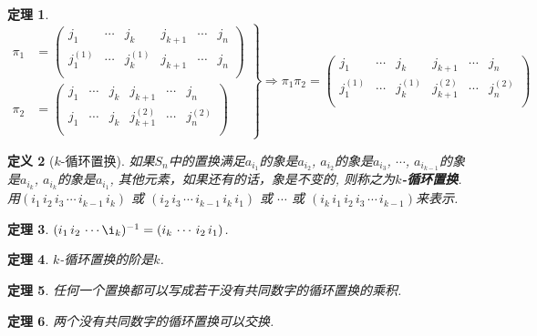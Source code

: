 \documentclass[UTF8]{ctexart}
\newtheorem{Definition}{定义}%
\newtheorem{Theorem}[Definition]{定理}
\begin{document}
\begin{Theorem}
$$
\left.
\begin{aligned}
\pi_1 &= \begin{pmatrix} 
j_1       & \cdots & j_k       & j_{k+1} & \cdots & j_n \\
j_1^{(1)} & \cdots & j_k^{(1)} & j_{k+1} & \cdots & j_n \\
\end{pmatrix} \\
\pi_2 &= \begin{pmatrix} 
j_1       & \cdots & j_k       & j_{k+1}       & \cdots & j_n      \\
j_1       & \cdots & j_k       & j_{k+1}^{(2)} & \cdots & j_n^{(2)} \\
\end{pmatrix} 
\end{aligned}
\right\}
\Rightarrow
\pi_1 \pi_2 = \begin{pmatrix} 
j_1       & \cdots & j_k       & j_{k+1}       & \cdots & j_n \\
j_1^{(1)} & \cdots & j_k^{(1)} & j_{k+1}^{(2)} & \cdots & j_n^{(2)} \\
\end{pmatrix}
$$
\end{Theorem}

\begin{Definition}[$k$-循环置换]
如果$S_n$中的置换满足$a_{i_1}$的象是$a_{i_2}$, $a_{i_2}$的象是$a_{i_3}$, $\cdots$, 
$a_{i_{k-1}}$的象是$a_{i_k}$, $a_{i_{k}}$的象是$a_{i_1}$, 其他元素，如果还有的话，象是不变的, 则称之为\textbf{$k$-循环置换}.
用$(i_1 \, i_2 \, i_3 \, \cdots \, i_{k-1} \, i_k)$ 或 
$(i_2 \, i_3 \, \cdots \, i_{k-1} \, i_k \, i_1)$ 或 $\cdots$ 或   
$( i_k \, i_1 \, i_2 \, i_3 \, \cdots \, i_{k-1})$来表示.
\end{Definition}

\begin{Theorem}
$(i_1 \, i_2 \, \cdots \i_k)^{-1} = (i_k \, \cdots \, i_2 \, i_1)$.
\end{Theorem}

\begin{Theorem}
$k$-循环置换的阶是$k$.
\end{Theorem}

\begin{Theorem}
任何一个置换都可以写成若干没有共同数字的循环置换的乘积.
\end{Theorem}

\begin{Theorem}
两个没有共同数字的循环置换可以交换.
\end{Theorem}
\end{document}
